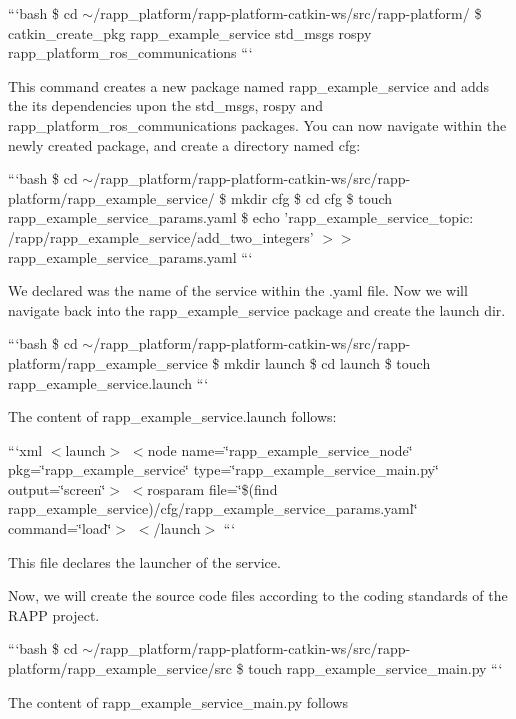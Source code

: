 ```bash \$ cd $\sim$/rapp\-\_\-platform/rapp-\/platform-\/catkin-\/ws/src/rapp-\/platform/ \$ catkin\-\_\-create\-\_\-pkg rapp\-\_\-example\-\_\-service std\-\_\-msgs rospy rapp\-\_\-platform\-\_\-ros\-\_\-communications ```

This command creates a new package named rapp\-\_\-example\-\_\-service and adds the its dependencies upon the std\-\_\-msgs, rospy and rapp\-\_\-platform\-\_\-ros\-\_\-communications packages. You can now navigate within the newly created package, and create a directory named cfg\-:

```bash \$ cd $\sim$/rapp\-\_\-platform/rapp-\/platform-\/catkin-\/ws/src/rapp-\/platform/rapp\-\_\-example\-\_\-service/ \$ mkdir cfg \$ cd cfg \$ touch rapp\-\_\-example\-\_\-service\-\_\-params.\-yaml \$ echo 'rapp\-\_\-example\-\_\-service\-\_\-topic\-: /rapp/rapp\-\_\-example\-\_\-service/add\-\_\-two\-\_\-integers' $>$$>$ rapp\-\_\-example\-\_\-service\-\_\-params.\-yaml ```

We declared was the name of the service within the .yaml file. Now we will navigate back into the rapp\-\_\-example\-\_\-service package and create the launch dir.

```bash \$ cd $\sim$/rapp\-\_\-platform/rapp-\/platform-\/catkin-\/ws/src/rapp-\/platform/rapp\-\_\-example\-\_\-service \$ mkdir launch \$ cd launch \$ touch rapp\-\_\-example\-\_\-service.\-launch ```

The content of {\ttfamily rapp\-\_\-example\-\_\-service.\-launch} follows\-:

```xml $<$launch$>$ $<$node name=\char`\"{}rapp\-\_\-example\-\_\-service\-\_\-node\char`\"{} pkg=\char`\"{}rapp\-\_\-example\-\_\-service\char`\"{} type=\char`\"{}rapp\-\_\-example\-\_\-service\-\_\-main.\-py\char`\"{} output=\char`\"{}screen\char`\"{}$>$ $<$rosparam file=\char`\"{}\$(find rapp\-\_\-example\-\_\-service)/cfg/rapp\-\_\-example\-\_\-service\-\_\-params.\-yaml\char`\"{} command=\char`\"{}load\char`\"{}$>$ $<$/launch$>$ ```

This file declares the launcher of the service.

Now, we will create the source code files according to the coding standards of the R\-A\-P\-P project.

```bash \$ cd $\sim$/rapp\-\_\-platform/rapp-\/platform-\/catkin-\/ws/src/rapp-\/platform/rapp\-\_\-example\-\_\-service/src \$ touch rapp\-\_\-example\-\_\-service\-\_\-main.\-py ```

The content of {\ttfamily rapp\-\_\-example\-\_\-service\-\_\-main.\-py} follows

